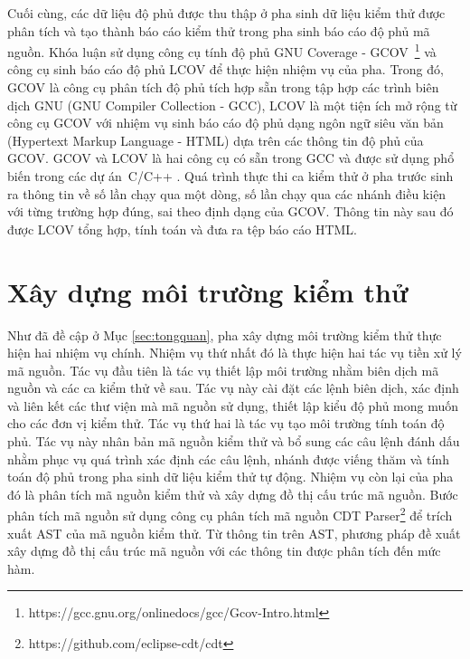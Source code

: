 Cuối cùng, các dữ liệu độ phủ được thu thập ở pha sinh dữ liệu kiểm thử được phân tích và tạo thành báo cáo kiểm thử trong pha sinh báo cáo độ phủ mã nguồn. Khóa luận sử dụng công cụ tính độ phủ GNU Coverage - GCOV~\footnote{https://gcc.gnu.org/onlinedocs/gcc/Gcov-Intro.html} và công cụ sinh báo cáo độ phủ LCOV để thực hiện nhiệm vụ của pha. Trong đó, GCOV là công cụ phân tích độ phủ tích hợp sẵn trong tập hợp các trình biên dịch GNU (GNU Compiler Collection - GCC), LCOV là một tiện ích mở rộng từ công cụ GCOV với nhiệm vụ sinh báo cáo độ phủ dạng ngôn ngữ siêu văn bản (Hypertext Markup Language - HTML) dựa trên các thông tin độ phủ của GCOV. GCOV và LCOV là hai công cụ có sẵn trong GCC và được sử dụng phổ biến trong các dự án~C/C++ \cite{hu2021software}. Quá trình thực thi ca kiểm thử ở pha trước sinh ra thông tin về số lần chạy qua một dòng, số lần chạy qua các nhánh điều kiện với từng trường hợp đúng, sai theo định dạng của GCOV. Thông tin này sau đó được LCOV tổng hợp, tính toán và đưa ra tệp báo cáo HTML.

\section{Xây dựng môi trường kiểm thử} \label{sec:3-build-env}
Như đã đề cập ở Mục \autoref{sec:tongquan}, pha xây dựng môi trường kiểm thử thực hiện hai nhiệm vụ chính. Nhiệm vụ thứ nhất đó là thực hiện hai tác vụ tiền xử lý mã nguồn. Tác vụ đầu tiên là tác vụ thiết lập môi trường nhằm biên dịch mã nguồn và các ca kiểm thử về sau. Tác vụ này cài đặt các lệnh biên dịch, xác định và liên kết các thư viện mà mã nguồn sử dụng, thiết lập kiểu độ phủ mong muốn cho các đơn vị kiểm thử. Tác vụ thứ hai là tác vụ tạo môi trường tính toán độ phủ. Tác vụ này nhân bản mã nguồn kiểm thử và bổ sung các câu lệnh đánh dấu nhằm phục vụ quá trình xác định các câu lệnh, nhánh được viếng thăm và tính toán độ phủ trong pha sinh dữ liệu kiểm thử tự động. Nhiệm vụ còn lại của pha đó là phân tích mã nguồn kiểm thử và xây dựng đồ thị cấu trúc mã nguồn. Bước phân tích mã nguồn sử dụng công cụ phân tích mã nguồn CDT Parser\footnote{https://github.com/eclipse-cdt/cdt} để trích xuất AST của mã nguồn kiểm thử. Từ thông tin trên AST, phương pháp đề xuất xây dựng đồ thị cấu trúc mã nguồn với các thông tin được phân tích đến mức hàm.

